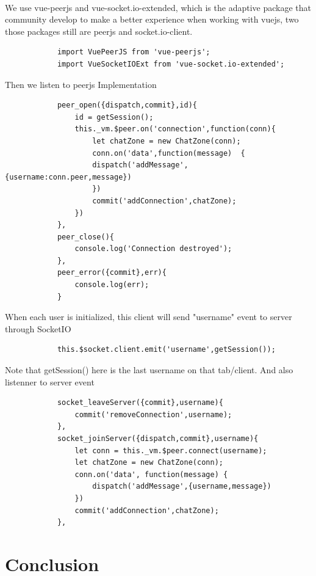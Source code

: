 \documentclass{article}
\begin{document}
        \paragraph{}
        We use vue-peerjs and vue-socket.io-extended, which is the adaptive package that community develop to make a better experience when working with vuejs, two those packages still are peerjs and socket.io-client.
        \begin{lstlisting}
            import VuePeerJS from 'vue-peerjs';
            import VueSocketIOExt from 'vue-socket.io-extended';
        \end{lstlisting}
        Then we listen to peerjs Implementation
        \begin{lstlisting}
            peer_open({dispatch,commit},id){
                id = getSession();
                this._vm.$peer.on('connection',function(conn){
                    let chatZone = new ChatZone(conn);
                    conn.on('data',function(message)  {
                    dispatch('addMessage',{username:conn.peer,message})
                    })
                    commit('addConnection',chatZone);
                })
            },
            peer_close(){
                console.log('Connection destroyed');
            },
            peer_error({commit},err){
                console.log(err);
            }
        \end{lstlisting}
        When each user is initialized, this client will send "username" event to server through SocketIO
        \begin{lstlisting}
            this.$socket.client.emit('username',getSession());
        \end{lstlisting}
        Note that getSession() here is the last username on that tab/client.
        \newline
        And also listenner to server event
        \begin{lstlisting}
            socket_leaveServer({commit},username){
                commit('removeConnection',username);
            },
            socket_joinServer({dispatch,commit},username){
                let conn = this._vm.$peer.connect(username);
                let chatZone = new ChatZone(conn);
                conn.on('data', function(message) {
                    dispatch('addMessage',{username,message})
                })
                commit('addConnection',chatZone);
            },
        \end{lstlisting}
\section{Conclusion}
\end{document}
